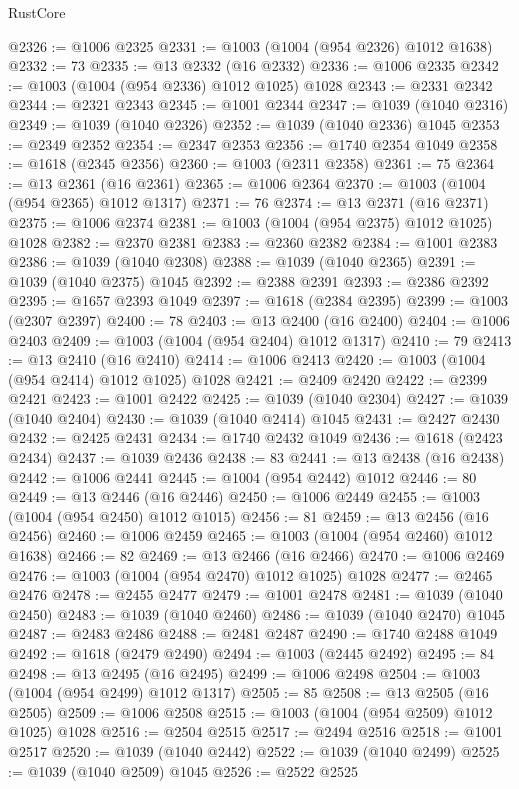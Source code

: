\begin{lexlean}{RustCore}
\begin{coremodule}
@2326 := @1006 @2325
@2331 := @1003 (@1004 (@954 @2326) @1012 @1638)
@2332 := 73
@2335 := @13 @2332 (@16 @2332)
@2336 := @1006 @2335
@2342 := @1003 (@1004 (@954 @2336) @1012 @1025) @1028
@2343 := @2331 @2342
@2344 := @2321 @2343
@2345 := @1001 @2344
@2347 := @1039 (@1040 @2316)
@2349 := @1039 (@1040 @2326)
@2352 := @1039 (@1040 @2336) @1045
@2353 := @2349 @2352
@2354 := @2347 @2353
@2356 := @1740 @2354 @1049
@2358 := @1618 (@2345 @2356)
@2360 := @1003 (@2311 @2358)
@2361 := 75
@2364 := @13 @2361 (@16 @2361)
@2365 := @1006 @2364
@2370 := @1003 (@1004 (@954 @2365) @1012 @1317)
@2371 := 76
@2374 := @13 @2371 (@16 @2371)
@2375 := @1006 @2374
@2381 := @1003 (@1004 (@954 @2375) @1012 @1025) @1028
@2382 := @2370 @2381
@2383 := @2360 @2382
@2384 := @1001 @2383
@2386 := @1039 (@1040 @2308)
@2388 := @1039 (@1040 @2365)
@2391 := @1039 (@1040 @2375) @1045
@2392 := @2388 @2391
@2393 := @2386 @2392
@2395 := @1657 @2393 @1049
@2397 := @1618 (@2384 @2395)
@2399 := @1003 (@2307 @2397)
@2400 := 78
@2403 := @13 @2400 (@16 @2400)
@2404 := @1006 @2403
@2409 := @1003 (@1004 (@954 @2404) @1012 @1317)
@2410 := 79
@2413 := @13 @2410 (@16 @2410)
@2414 := @1006 @2413
@2420 := @1003 (@1004 (@954 @2414) @1012 @1025) @1028
@2421 := @2409 @2420
@2422 := @2399 @2421
@2423 := @1001 @2422
@2425 := @1039 (@1040 @2304)
@2427 := @1039 (@1040 @2404)
@2430 := @1039 (@1040 @2414) @1045
@2431 := @2427 @2430
@2432 := @2425 @2431
@2434 := @1740 @2432 @1049
@2436 := @1618 (@2423 @2434)
@2437 := @1039 @2436
@2438 := 83
@2441 := @13 @2438 (@16 @2438)
@2442 := @1006 @2441
@2445 := @1004 (@954 @2442) @1012
@2446 := 80
@2449 := @13 @2446 (@16 @2446)
@2450 := @1006 @2449
@2455 := @1003 (@1004 (@954 @2450) @1012 @1015)
@2456 := 81
@2459 := @13 @2456 (@16 @2456)
@2460 := @1006 @2459
@2465 := @1003 (@1004 (@954 @2460) @1012 @1638)
@2466 := 82
@2469 := @13 @2466 (@16 @2466)
@2470 := @1006 @2469
@2476 := @1003 (@1004 (@954 @2470) @1012 @1025) @1028
@2477 := @2465 @2476
@2478 := @2455 @2477
@2479 := @1001 @2478
@2481 := @1039 (@1040 @2450)
@2483 := @1039 (@1040 @2460)
@2486 := @1039 (@1040 @2470) @1045
@2487 := @2483 @2486
@2488 := @2481 @2487
@2490 := @1740 @2488 @1049
@2492 := @1618 (@2479 @2490)
@2494 := @1003 (@2445 @2492)
@2495 := 84
@2498 := @13 @2495 (@16 @2495)
@2499 := @1006 @2498
@2504 := @1003 (@1004 (@954 @2499) @1012 @1317)
@2505 := 85
@2508 := @13 @2505 (@16 @2505)
@2509 := @1006 @2508
@2515 := @1003 (@1004 (@954 @2509) @1012 @1025) @1028
@2516 := @2504 @2515
@2517 := @2494 @2516
@2518 := @1001 @2517
@2520 := @1039 (@1040 @2442)
@2522 := @1039 (@1040 @2499)
@2525 := @1039 (@1040 @2509) @1045
@2526 := @2522 @2525

\end{coremodule}
\end{lexlean}
